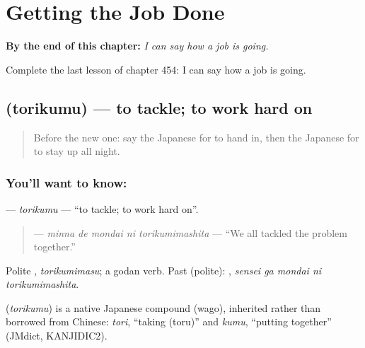 
\chapter{Getting the Job Done}
\label{ch:ja-getting-the-job-done}

\begin{chapteropening}
\textbf{By the end of this chapter:} \emph{I can say how a job is going.}

Complete the last lesson of chapter 454: I can say how a job is going.
\end{chapteropening}

\section[\texorpdfstring{\ja{とりくむ} (torikumu)}{とりくむ (torikumu)}]{ (torikumu) — to tackle; to work hard on}

\label{lesson:JA-C454-torikumu}



\begin{quote}
Before the new one: say the Japanese for to hand in, then the Japanese for to stay up all night.
\end{quote}

\subsection*{You'll want to know: }
\textbf{} — \emph{torikumu} — \textquotedblleft{}to tackle; to work hard on\textquotedblright{}.

\begin{quote}
\textbf{  } — \emph{minna de mondai ni torikumimashita} — \textquotedblleft{}We all tackled the problem together.\textquotedblright{}
\end{quote}

Polite \textbf{}, \emph{torikumimasu}; a godan verb. Past (polite): \textbf{  }, \emph{sensei ga mondai ni torikumimashita}.

\begin{cousinweb}
\textbf{} (\emph{torikumu}) is a native Japanese compound (wago), inherited rather than borrowed from Chinese: \emph{tori}, \textquotedblleft{}taking (toru)\textquotedblright{} and \emph{kumu}, \textquotedblleft{}putting together\textquotedblright{} (JMdict, KANJIDIC2).
\end{cousinweb}

